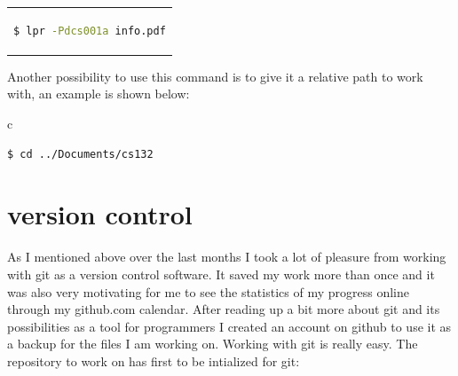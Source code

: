 \documentclass[12pt,a4paper]{article}
\begin{document}
\begin{enumerate}
\begin{center}
\begin{tabular}{c}
\begin{lstlisting}[language=bash]
  $ lpr -Pdcs001a info.pdf
\end{lstlisting}
\end{tabular}
\end{center}
\item \textbf{cd}: an essential command to navigate is cd and its ease of use is wonderful. To navigate somewhere, it is possible to give the command an absolute path, which could be something like this:
\begin{center}
\begin{tabular}{c}
\begin{lstlisting}[language=bash]
  $ cd /mnt/c/Users/Public
\end{lstlisting}
\end{tabular}
\end{center}
Another possibility to use this command is to give it a relative path to work with, an example is shown below:

\begin{center}
\begin{tabular}{c}
\begin{lstlisting}[language=bash]
  $ cd ../Documents/cs132
\end{lstlisting}
\end{tabular}
\end{center}
\end{enumerate}
\section{version control}
As I mentioned above over the last months I took a lot of pleasure from working with git as a version control software. It saved my work more than once and it was also very motivating for me to see the statistics of my progress online through my github.com calendar. After reading up a bit more about git and its possibilities as a tool for programmers I created an account on github to use it as a backup for the files I am working on. Working with git is really easy. The repository to work on has first to be intialized for git:
\end{document}
